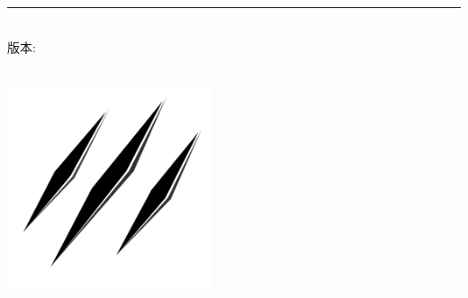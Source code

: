 %
\begin{titlepage}
	\flushright
	\hfill
	\vfill
	{\LARGE\thesisTitle} \par
	\rule[5pt]{\textwidth}{.4pt} \par
	{\Large\thesisTeam}
	\vfill
	\textit{\large\thesisDate} \\
	版本: \thesisVersion
\end{titlepage}


\begin{titlepage}
	\tgherosfont
	\centering
	
	{\Large \thesisUniversity} \\[4mm]
	\includegraphics[width=6cm]{image/SixBeasts.png} \\[2mm]
	\textsf{\thesisUniversityInstitute} \\
	\textsf{\thesisUniversityGroup} \\
	
	\vfill
	{\large \thesisSubject} \\[5mm]
	{\LARGE \color{ctcolormain}\textbf{\thesisTitle} \\[10mm]}
	{\Large \thesisTeam} \\
	
	\vfill
    \begin{XeAuthors}
    \end{XeAuthors}
    \thesisUniversityGroup \\
	\thesisDate \\
\end{titlepage}


